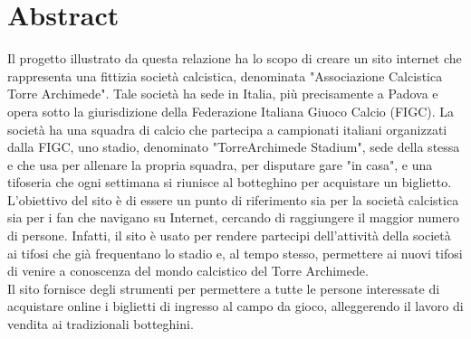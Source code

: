 \section{Abstract}
    Il progetto illustrato da questa relazione ha lo scopo di creare un sito internet che rappresenta una fittizia società calcistica, denominata "Associazione Calcistica Torre Archimede". Tale società ha sede in Italia, più precisamente a Padova e opera sotto la giurisdizione della Federazione Italiana Giuoco Calcio (FIGC). La società ha una squadra di calcio che partecipa a campionati italiani organizzati dalla FIGC, uno stadio, denominato "TorreArchimede Stadium", sede della stessa e che usa per allenare la propria squadra, per disputare gare "in casa", e una tifoseria che ogni settimana si riunisce al botteghino per acquistare un biglietto.\\
    L'obiettivo del sito è di essere un punto di riferimento sia per la società calcistica sia per i fan che navigano su Internet, cercando di raggiungere il maggior numero di persone. Infatti, il sito è usato per rendere partecipi dell'attività della società ai tifosi che già frequentano lo stadio e, al tempo stesso, permettere ai nuovi tifosi di venire a conoscenza del mondo calcistico del Torre Archimede.\\
    Il sito fornisce degli strumenti per permettere a tutte le persone interessate di acquistare online i biglietti di ingresso al campo da gioco, alleggerendo il lavoro di vendita ai tradizionali botteghini.




